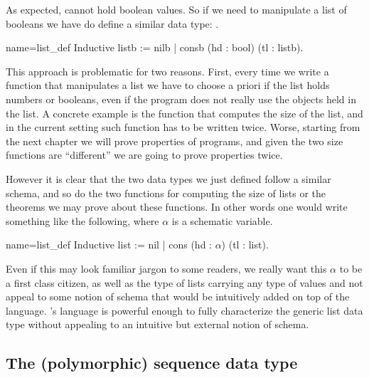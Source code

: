 As expected,  %
cannot hold boolean values.
So if we need to
manipulate a list of booleans we have do define a similar data type:
.

\begin{coq}{name=list_def}{}
Inductive listb := nilb | consb (hd : bool) (tl : listb).
\end{coq}

This approach is problematic for two reasons.  First, every time we
write a function that manipulates a list we have to choose a priori
if the list holds numbers or booleans, even if the program does not
really use the objects held in the list.
A concrete example is the function that computes the size of the list,
and in the current setting such function has to be written twice.
Worse, starting from the next chapter we will prove properties of programs,
and given the two size functions are ``different'' we are going to prove
properties twice.

However it is clear that the two data types we just defined follow
a similar schema, and so do the two functions for computing the size of lists
or the theorems we may prove about these functions.  In other words
one would write something
like the following, where $\alpha$ is a schematic variable.

\begin{coq}{name=list_def}{}
Inductive list := nil | cons (hd : $\alpha$) (tl : list).
\end{coq}

\noindent Even if this may look familiar jargon to some readers, we really want
this $\alpha$ to be a first class citizen, as well as the type of lists carrying
any type of values and not appeal to some notion of schema that would be
intuitively added on top of the \Coq{} language. %
%
\Coq{}'s language is powerful enough to fully characterize the generic
list data type without appealing to an intuitive but external notion of
schema.

\subsection{The (polymorphic) sequence data type}

